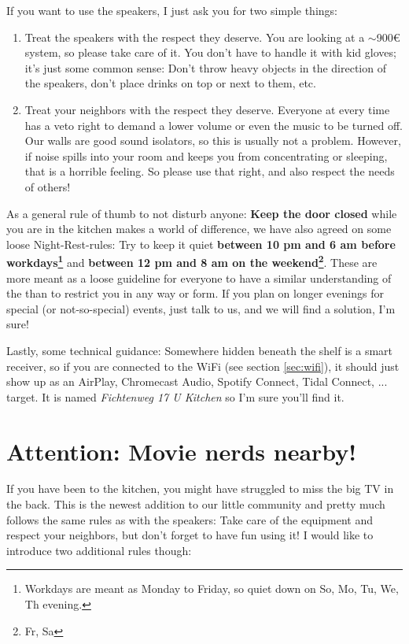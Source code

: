 If you want to use the speakers, I just ask you for two simple things:
\begin{enumerate}
    \item Treat the speakers with the respect they deserve. You are looking at a $\sim$900€ system, so please take care of it. You don't have to handle it with kid gloves; it's just some common sense: Don't throw heavy objects in the direction of the speakers, don't place drinks on top or next to them, etc.
    \item Treat your neighbors with the respect they deserve. Everyone at every time has a veto right to demand a lower volume or even the music to be turned off. Our walls are good sound isolators, so this is usually not a problem. However, if noise spills into your room and keeps you from concentrating or sleeping, that is a horrible feeling. So please use that right, and also respect the needs of others!
\end{enumerate}

As a general rule of thumb to not disturb anyone: \textbf{Keep the door closed} while you are in the kitchen makes a world of difference, we have also agreed on some loose Night-Rest-rules: Try to keep it quiet \textbf{between 10 pm and 6 am before workdays\footnote{Workdays are meant as Monday to Friday, so quiet down on So, Mo, Tu, We, Th evening.}} and \textbf{between 12 pm and 8 am on the weekend\footnote{Fr, Sa}}. These  are more meant as a loose guideline for everyone to have a similar understanding of the  than to restrict you in any way or form. If you plan on longer evenings for special (or not-so-special) events, just talk to us, and we will find a solution, I'm sure!

Lastly, some technical guidance: Somewhere hidden beneath the shelf is a smart receiver, so if you are connected to the WiFi (see section \ref{sec:wifi}), it should just show up as an AirPlay, Chromecast Audio, Spotify Connect, Tidal Connect, ... target. It is named \textit{Fichtenweg 17 U Kitchen} so I'm sure you'll find it.

\section{Attention: Movie nerds nearby!}

If you have been to the kitchen, you might have struggled to miss the big TV in the back. This is the newest addition to our little community and pretty much follows the same rules as with the speakers: Take care of the equipment and respect your neighbors, but don't forget to have fun using it! I would like to introduce two additional rules though:

